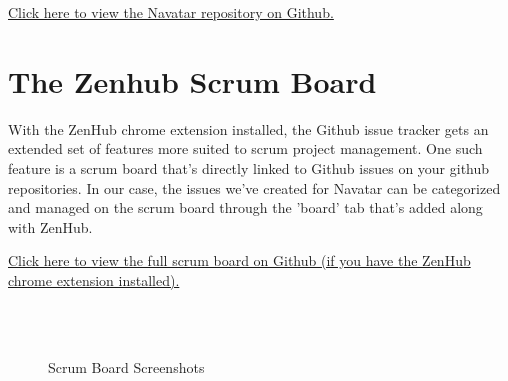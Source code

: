 \documentclass{scrreprt}
\begin{document}
\href{https://github.com/matthewjberger/navatar/}{Click here to view the Navatar repository on Github.}

\pagebreak

\section{The Zenhub Scrum Board}

With the ZenHub chrome extension installed, the Github issue tracker gets an extended set of features more suited to scrum project management. One such feature is a scrum board that's directly linked to Github issues on your github repositories. In our case, the issues we've created for Navatar can be categorized and managed on the scrum board through the 'board' tab that's added along with ZenHub.

\href{https://github.com/matthewjberger/navatar/issues\#boards?repos=80390803}{Click here to view the full scrum board on Github (if you have the ZenHub chrome extension installed).}

\begin{figure}[ht!]
     \begin{center}
%
        \\%
        \\%
    \end{center}
    \caption{%
        Scrum Board Screenshots
     }%
   \label{fig:subfigures}
\end{figure}
\end{document}

